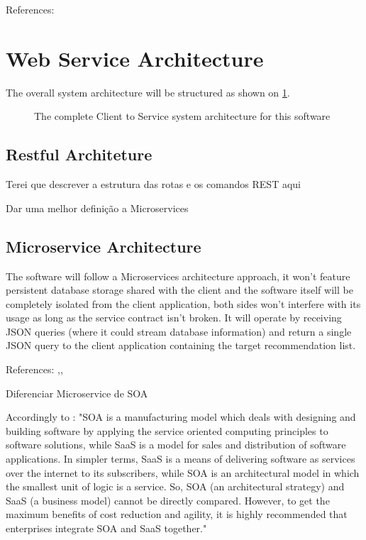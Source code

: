 References: 

\section{Web Service Architecture}
\acresetall

The overall system architecture will be structured as shown on \ref{fig:client_to_service}.

\begin{figure}[hbt!]
  \centering
  
  \caption{The complete Client to Service system architecture for this software}
  \label{fig:client_to_service}
\end{figure}


\subsection{Restful Architeture}
\acresetall

Terei que descrever a estrutura das rotas e os comandos REST aqui

Dar uma melhor definição a Microservices


\subsection{Microservice Architecture}
\acresetall

The software will follow a Microservices architecture approach, it won’t feature persistent database storage shared with the client and the software itself will be completely isolated from the client application, both sides won’t interfere with its usage as long as the service contract isn’t broken. It will operate by receiving JSON queries (where it could stream database information) and return a single JSON query to the client application containing the target recommendation list.

References: ,, 


Diferenciar Microservice de SOA

Accordingly to : "SOA is a manufacturing model which deals with designing and building software by applying the service oriented computing principles to software solutions, while SaaS is a model for sales and distribution of software applications. In simpler terms, SaaS is a means of delivering software as services over the internet to its subscribers, while SOA is an architectural model in which the smallest unit of logic is a service. So, SOA (an architectural strategy) and SaaS (a business model) cannot be directly compared. However, to get the maximum benefits of cost reduction and agility, it is highly recommended that enterprises integrate SOA and SaaS together."


